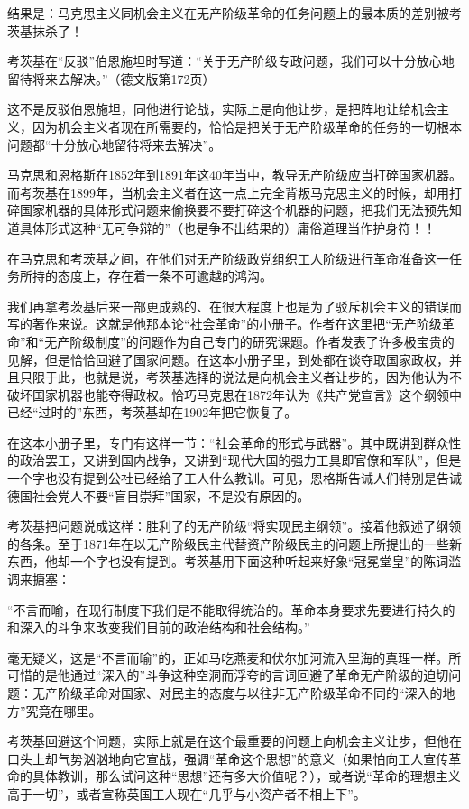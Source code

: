 \documentclass[UTF8, 12pt, a4paper]{ctexrep}
\begin{document}
结果是：马克思主义同机会主义在无产阶级革命的任务问题上的最本质的差别被考茨基抹杀了！

考茨基在“反驳”伯恩施坦时写道：“关于无产阶级专政问题，我们可以十分放心地留待将来去解决。”（德文版第172页）

这不是反驳伯恩施坦，同他进行论战，实际上是向他让步，是把阵地让给机会主义，因为机会主义者现在所需要的，恰恰是把关于无产阶级革命的任务的一切根本问题都“十分放心地留待将来去解决”。

马克思和恩格斯在1852年到1891年这40年当中，教导无产阶级应当打碎国家机器。而考茨基在1899年，当机会主义者在这一点上完全背叛马克思主义的时候，却用打碎国家机器的具体形式问题来偷换要不要打碎这个机器的问题，把我们无法预先知道具体形式这种“无可争辩的”（也是争不出结果的）庸俗道理当作护身符！！

在马克思和考茨基之间，在他们对无产阶级政党组织工人阶级进行革命准备这一任务所持的态度上，存在着一条不可逾越的鸿沟。

我们再拿考茨基后来一部更成熟的、在很大程度上也是为了驳斥机会主义的错误而写的著作来说。这就是他那本论“社会革命”的小册子。作者在这里把“无产阶级革命”和“无产阶级制度”的问题作为自己专门的研究课题。作者发表了许多极宝贵的见解，但是恰恰回避了国家问题。在这本小册子里，到处都在谈夺取国家政权，并且只限于此，也就是说，考茨基选择的说法是向机会主义者让步的，因为他认为不破坏国家机器也能夺得政权。恰巧马克思在1872年认为《共产党宣言》这个纲领中已经“过时的”东西，考茨基却在1902年把它恢复了。

在这本小册子里，专门有这样一节：“社会革命的形式与武器”。其中既讲到群众性的政治罢工，又讲到国内战争，又讲到“现代大国的强力工具即官僚和军队”，但是一个字也没有提到公社已经给了工人什么教训。可见，恩格斯告诫人们特别是告诫德国社会党人不要“盲目崇拜”国家，不是没有原因的。

考茨基把问题说成这样：胜利了的无产阶级“将实现民主纲领”。接着他叙述了纲领的各条。至于1871年在以无产阶级民主代替资产阶级民主的问题上所提出的一些新东西，他却一个字也没有提到。考茨基用下面这种听起来好象“冠冕堂皇”的陈词滥调来搪塞：

“不言而喻，在现行制度下我们是不能取得统治的。革命本身要求先要进行持久的和深入的斗争来改变我们目前的政治结构和社会结构。”

毫无疑义，这是“不言而喻”的，正如马吃燕麦和伏尔加河流入里海的真理一样。所可惜的是他通过“深入的”斗争这种空洞而浮夸的言词回避了革命无产阶级的迫切问题：无产阶级革命对国家、对民主的态度与以往非无产阶级革命不同的“深入的地方”究竟在哪里。

考茨基回避这个问题，实际上就是在这个最重要的问题上向机会主义让步，但他在口头上却气势汹汹地向它宣战，强调“革命这个思想”的意义（如果怕向工人宣传革命的具体教训，那么试问这种“思想”还有多大价值呢？），或者说“革命的理想主义高于一切”，或者宣称英国工人现在“几乎与小资产者不相上下”。
\end{document}
